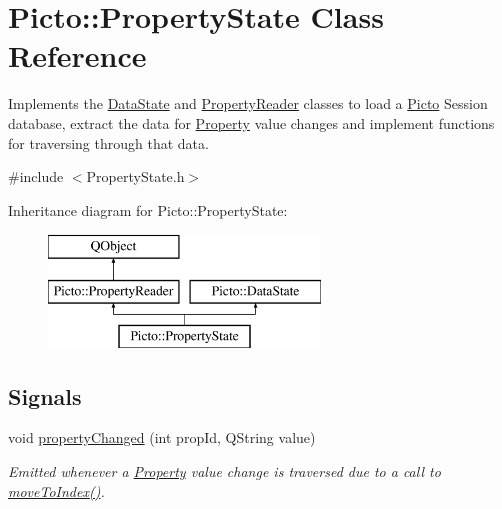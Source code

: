 \hypertarget{class_picto_1_1_property_state}{\section{Picto\-:\-:Property\-State Class Reference}
\label{class_picto_1_1_property_state}
}


Implements the \hyperlink{class_picto_1_1_data_state}{Data\-State} and \hyperlink{class_picto_1_1_property_reader}{Property\-Reader} classes to load a \hyperlink{namespace_picto}{Picto} Session database, extract the data for \hyperlink{class_picto_1_1_property}{Property} value changes and implement functions for traversing through that data.  




{\ttfamily \#include $<$Property\-State.\-h$>$}

Inheritance diagram for Picto\-:\-:Property\-State\-:\begin{figure}[H]
\begin{center}
\leavevmode
\includegraphics[height=3.000000cm]{class_picto_1_1_property_state}
\end{center}
\end{figure}
\subsection*{Signals}
\begin{DoxyCompactItemize}
\item 
void \hyperlink{class_picto_1_1_property_state_a2e3494edb897629349f7cd4506c03f10}{property\-Changed} (int prop\-Id, Q\-String value)
\begin{DoxyCompactList}\small\item\em Emitted whenever a \hyperlink{class_picto_1_1_property}{Property} value change is traversed due to a call to \hyperlink{class_picto_1_1_property_state_ab6fd8407780b65caf4a1177c799c8c28}{move\-To\-Index()}. \end{DoxyCompactList}\end{DoxyCompactItemize}

